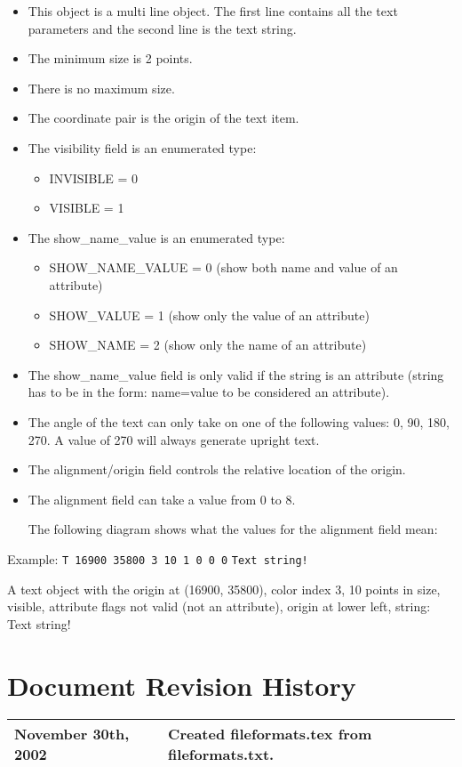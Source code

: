 \documentclass{article}
\begin{document}
\begin{itemize}
\item This object is a multi line object.  The first line contains all the 
      text parameters and the second line is the text string.
\item The minimum size is 2 points.
\item There is no maximum size.
\item The coordinate pair is the origin of the text item.
\item The visibility field is an enumerated type:
\begin{itemize}
	\item INVISIBLE = 0 
	\item VISIBLE = 1
\end{itemize}
\item The show\_name\_value is an enumerated type:
\begin{itemize}
	\item SHOW\_NAME\_VALUE = 0  (show both name and value of an attribute)
	\item SHOW\_VALUE = 1 (show only the value of an attribute)
	\item SHOW\_NAME = 2  (show only the name of an attribute)
\end{itemize}
\item The show\_name\_value field is only valid if the string is an attribute
      (string has to be in the form: name=value to be considered an attribute).
\item The angle of the text can only take on one of the following values: 
      0, 90, 180, 270.  A value of 270 will always generate upright text.
\item The alignment/origin field controls the relative location of the 
      origin.
\item The alignment field can take a value from 0 to 8.

The following diagram shows what the values for the alignment field mean:

\begin{center}
\end{center}
\end{itemize}

Example:\newline 
{\tt T 16900 35800 3 10 1 0 0 0}\newline
{\tt Text string!}

A text object with the origin at (16900, 35800), color index 3, 10 points in
size, visible, attribute flags not valid (not an attribute), origin at lower
left, string: Text string!

\newpage
\section{Document Revision History}

\begin{table}[h]
\begin{tabular}{|l|l|} \hline
November 30th, 2002 & Created fileformats.tex from fileformats.txt. \\ \hline
\end{tabular}
\end{table}
\end{document}
